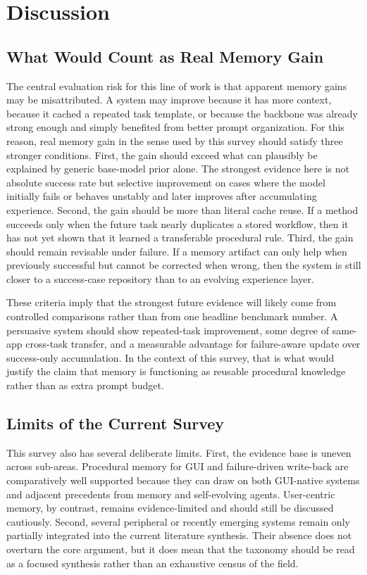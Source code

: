 \documentclass{article}
\begin{document}
\section{Discussion}\label{9-discussion}

\subsection{What Would Count as Real Memory Gain}\label{91-what-would-count-as-real-memory-gain}

The central evaluation risk for this line of work is that apparent
memory gains may be misattributed. A system may improve because it has
more context, because it cached a repeated task template, or because the
backbone was already strong enough and simply benefited from better
prompt organization. For this reason, real memory gain in the sense used
by this survey should satisfy three stronger conditions. First, the gain
should exceed what can plausibly be explained by generic base-model
prior alone. The strongest evidence here is not absolute success rate
but selective improvement on cases where the model initially fails or
behaves unstably and later improves after accumulating experience.
Second, the gain should be more than literal cache reuse. If a method
succeeds only when the future task nearly duplicates a stored workflow,
then it has not yet shown that it learned a transferable procedural
rule. Third, the gain should remain revisable under failure. If a memory
artifact can only help when previously successful but cannot be
corrected when wrong, then the system is still closer to a success-case
repository than to an evolving experience layer.

These criteria imply that the strongest future evidence will likely come
from controlled comparisons rather than from one headline benchmark
number. A persuasive system should show repeated-task improvement, some
degree of same-app cross-task transfer, and a measurable advantage for
failure-aware update over success-only accumulation. In the context of
this survey, that is what would justify the claim that memory is
functioning as reusable procedural knowledge rather than as extra prompt
budget.

\subsection{Limits of the Current Survey}\label{92-limits-of-the-current-survey}

This survey also has several deliberate limits. First, the evidence base
is uneven across sub-areas. Procedural memory for GUI and failure-driven
write-back are comparatively well supported because they can draw on
both GUI-native systems and adjacent precedents from memory and
self-evolving agents. User-centric memory, by contrast, remains
evidence-limited and should still be discussed cautiously. Second,
several peripheral or recently emerging systems remain only partially
integrated into the current literature synthesis. Their absence does not
overturn the core argument, but it does mean that the taxonomy should be
read as a focused synthesis rather than an exhaustive census of the
field.
\end{document}
